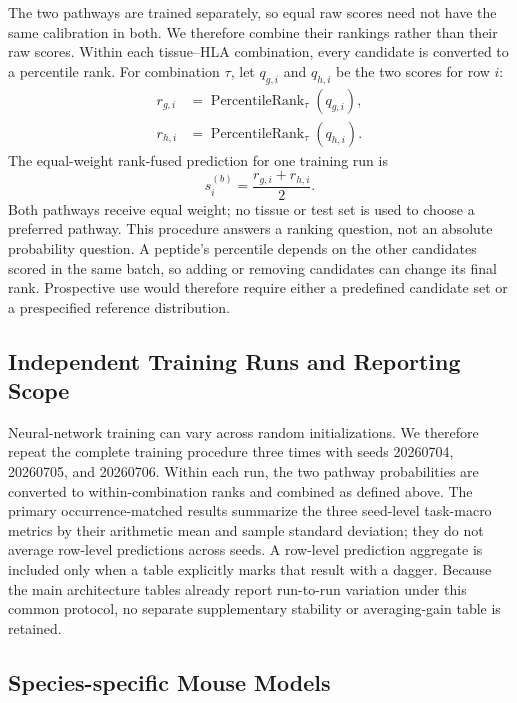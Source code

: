 The two pathways are trained separately, so equal raw scores need not have the same calibration in both. We therefore combine their rankings rather than their raw scores. Within each tissue--HLA combination, every candidate is converted to a percentile rank. For combination \(\tau\), let \(q_{g,i}\) and \(q_{h,i}\) be the two scores for row \(i\):
\[
\begin{aligned}
r_{g,i}
&=
\operatorname{PercentileRank}_{\tau}(q_{g,i}),\\
r_{h,i}
&=
\operatorname{PercentileRank}_{\tau}(q_{h,i}).
\end{aligned}
\]
The equal-weight rank-fused prediction for one training run is
\[
s_i^{(b)}
=
\frac{r_{g,i}+r_{h,i}}{2}.
\]
Both pathways receive equal weight; no tissue or test set is used to choose a preferred pathway. This procedure answers a ranking question, not an absolute probability question. A peptide's percentile depends on the other candidates scored in the same batch, so adding or removing candidates can change its final rank. Prospective use would therefore require either a predefined candidate set or a prespecified reference distribution.

\subsection{Independent Training Runs and Reporting Scope}

Neural-network training can vary across random initializations. We therefore repeat the complete training procedure three times with seeds 20260704, 20260705, and 20260706. Within each run, the two pathway probabilities are converted to within-combination ranks and combined as defined above. The primary occurrence-matched results summarize the three seed-level task-macro metrics by their arithmetic mean and sample standard deviation; they do not average row-level predictions across seeds. A row-level prediction aggregate is included only when a table explicitly marks that result with a dagger. Because the main architecture tables already report run-to-run variation under this common protocol, no separate supplementary stability or averaging-gain table is retained.

\subsection{Species-specific Mouse Models}

